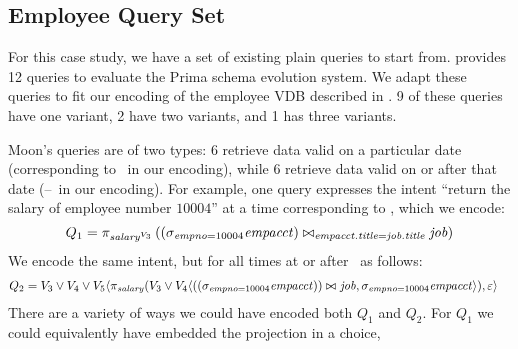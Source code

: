 \subsection{Employee Query Set}
\label{app:emp-qs}


For this case study, we have a set of existing plain queries to start from.
\citet{prima08Moon} provides 12 queries to evaluate the Prima schema evolution
system. We adapt these queries to fit our encoding of the employee VDB
described in .
%
%
9 of these queries have one variant, 2 have two variants, and 1 has three
variants. 


Moon's queries are of two types: 6 retrieve data valid on a particular date
(corresponding to \vThree\ in our encoding), while 6 retrieve data valid on or
after that date (\vThree--\vFive\ in our encoding).
%
For example, one query expresses the intent ``return the salary of employee
number $10004$'' at a time corresponding to \vThree, which we encode:
\[
Q_1 = \vPrj[\oatt{\salary}{\vThree}]{%
\left(  \joinRelR{\selectRel{\empno=10004}{\empacct}}{\job}
           {\empacct.\titleatt = \job.\titleatt} \right) }
\]
%
%
We encode the same intent, but for all times at or after \vThree\ as follows:
%
\begin{align*}
Q_2 &=  \vThree\vee\vFour\vee\vFive \langle \pi_\salary 
 (\vThree\vee\vFour\langle
    \joinRelR{(\vSel[\empno=10004]{\empacct})}{\job}
             {}, 
{\vSel[\empno=10004]{\empacct}}\rangle), \empRel\rangle
\end{align*}
%
There are a variety of ways we could have encoded both $Q_1$ and $Q_2$.
%
For $Q_1$ we could equivalently have embedded the projection in a choice,\\

